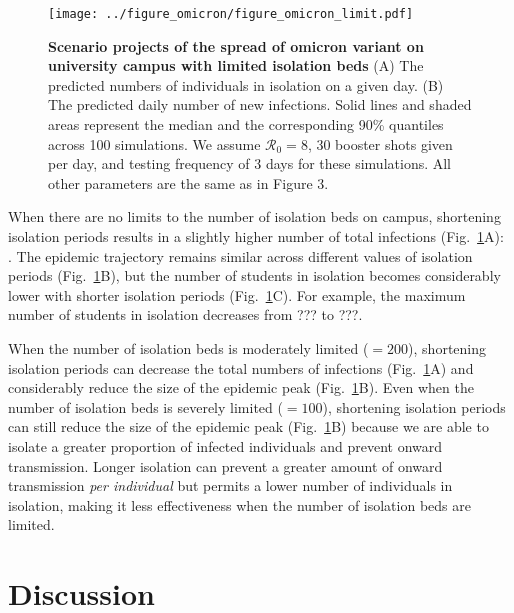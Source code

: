 \documentclass[12pt]{article}
\newcommand{\fref}[1]{Fig.~\ref{fig:#1}}
\begin{document}
\begin{figure}[!th]
\texttt{[image: ../figure\_omicron/figure\_omicron\_limit.pdf]}
\caption{
\textbf{Scenario projects of the spread of omicron variant on university campus with limited isolation beds}
(A) The predicted numbers of individuals in isolation on a given day.
(B) The predicted daily number of new infections.
Solid lines and shaded areas represent the median and the corresponding 90\% quantiles across 100 simulations.
We assume $\mathcal R_0 = 8$, 30 booster shots given per day, and testing frequency of 3 days for these simulations.
All other parameters are the same as in Figure 3.
\label{fig:isolation}
}
\end{figure}

When there are no limits to the number of isolation beds on campus, shortening isolation periods results in a slightly higher number of total infections (\fref{isolation}A): .
The epidemic trajectory remains similar across different values of isolation periods (\fref{isolation}B), but the number of students in isolation becomes considerably lower with shorter isolation periods (\fref{isolation}C).
For example, the maximum number of students in isolation decreases from ??? to ???.

When the number of isolation beds is moderately limited ($=200$), shortening isolation periods can decrease the total numbers of infections (\fref{isolation}A) and considerably reduce the size of the epidemic peak (\fref{isolation}B). 
Even when the number of isolation beds is severely limited ($=100$), shortening isolation periods can still reduce the size of the epidemic peak (\fref{isolation}B) because we are able to isolate a greater proportion of infected individuals and prevent onward transmission.
Longer isolation can prevent a greater amount of onward transmission \emph{per individual} but permits a lower number of individuals in isolation, making it less effectiveness when the number of isolation beds are limited.

\section*{Discussion}
\end{document}
